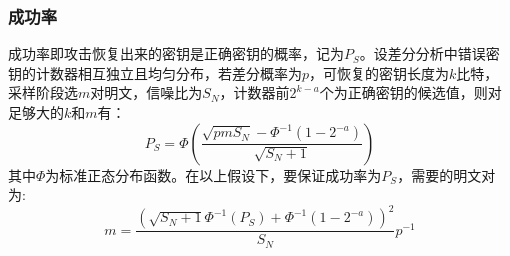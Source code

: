 \subsubsection{成功率}
成功率即攻击恢复出来的密钥是正确密钥的概率，记为$P_S$。设差分分析中错误密钥的计数器相互独立且均匀分布，若差分概率为$p$，可恢复的密钥长度为$k$比特，采样阶段选$m$对明文，信噪比为$S_N$，计数器前$2^{k-a}$个为正确密钥的候选值，则对足够大的$k$和$m$有：
$$
P_S = \Phi(\frac{\sqrt{pmS_N} - \Phi^{-1}(1-2^{-a})}{\sqrt{S_N+1}})
$$
其中$\Phi$为标准正态分布函数。在以上假设下，要保证成功率为$P_S$，需要的明文对为:
$$
m = \frac{(\sqrt{S_N + 1}\Phi^{-1}(P_S) + \Phi^{-1}(1-2^{-a}))^2 }{S_N}p^{-1}
$$
